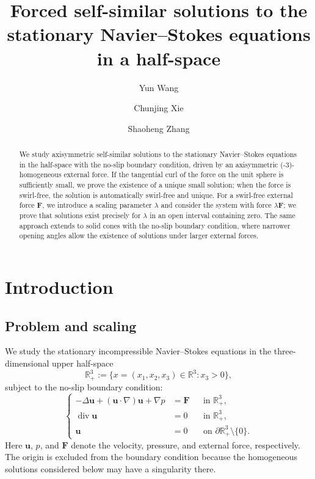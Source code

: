 \documentclass{amsart}
\title{Forced self-similar solutions to the stationary Navier--Stokes equations in a half-space}
\author{Yun Wang}
\author{Chunjing Xie}
\author{Shaoheng Zhang}
\newcommand{\Bu}{{\boldsymbol{u}}}
\newcommand{\BF}{{\boldsymbol{F}}}
\begin{document}
\begin{abstract}
We study axisymmetric self-similar solutions to the stationary Navier--Stokes equations in the half-space with the no-slip boundary condition, driven by an axisymmetric (-3)-homogeneous external force.
If the tangential curl of the force on the unit sphere is sufficiently small, we prove the existence of a unique small solution; when the force is swirl-free, the solution is automatically swirl-free and unique.
For a swirl-free external force $\boldsymbol{F}$, we introduce a scaling parameter $\lambda$ and consider the system with force $\lambda\boldsymbol{F}$; we prove that solutions exist precisely for $\lambda$ in an open interval containing zero. 
The same approach extends to solid cones with the no-slip boundary condition, where narrower opening angles allow the existence of solutions under  larger external forces.
\end{abstract}

\maketitle



\section{Introduction}

\subsection{Problem and scaling}

We study the stationary incompressible Navier--Stokes equations
in the three-dimensional upper half-space
\[
\mathbb R^3_+
:=
\{x=(x_1,x_2,x_3)\in\mathbb R^3:x_3>0\},
\]
subject to the no-slip boundary condition:
\begin{equation}\label{eqn:NSEhfD}
	\left\{
	\begin{aligned}
		-\Delta \Bu+(\Bu\cdot\nabla)\Bu+\nabla p
		&=\BF
		&&\text{in }\mathbb R^3_+,\\
		\operatorname{div}\Bu
		&=0
		&&\text{in }\mathbb R^3_+,\\
		\Bu
		&=0
		&&\text{on }\partial\mathbb R^3_+\setminus\{0\}.
	\end{aligned}
	\right.
\end{equation}
Here $\Bu$, $p$, and $\BF$ denote the velocity, pressure, and
external force, respectively. The origin is excluded from the
boundary condition because the homogeneous solutions considered
below may have a singularity there.
\end{document}
